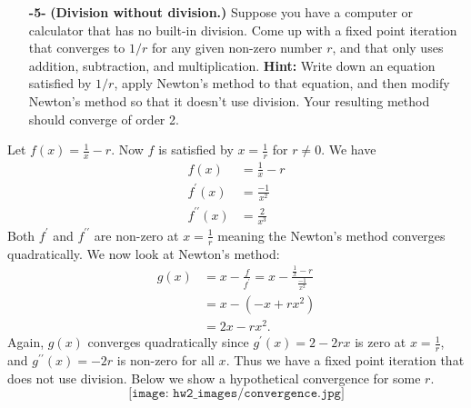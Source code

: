 \documentclass[11pt]{article}
\theoremstyle{definition}
\newcommand{\1}[1]{\mathbf{1} \left \{ #1 \right \}}
\begin{document}
\begin{itemize}
    \item[{\textbf{-5-}}] \textbf{(Division without division.)}  Suppose you have a computer or calculator that has no built-in division.  Come up with a fixed point iteration that converges to $1/r$ for any given non-zero number $r$, and that only uses addition, subtraction, and multiplication.  \textbf{Hint:}  Write down an equation satisfied by $1/r$, apply Newton's method to that equation, and then modify Newton's method so that it doesn't use division.  Your resulting method should converge of order 2.
\end{itemize}
Let \(f(x) = \frac{1}{x} - r\).  Now $f$ is satisfied by $x = \frac{1}{r}$ for $r \neq 0$.  We have
\begin{equation*}
    \begin{split}
        f(x) &= \frac{1}{x} - r \\
        f^{\prime}(x) &= \frac{-1}{x^2} \\
        f^{\prime\prime}(x) &= \frac{2}{x^3}
    \end{split}
\end{equation*}
Both $f^{\prime}$ and $f^{\prime\prime}$ are non-zero at $x = \frac{1}{r}$ meaning the Newton's method converges quadratically.  We now look at Newton's method:
\begin{equation*}
    \begin{split}
        g(x) &= x - \frac{f}{f^{\prime}} = x - \frac{\frac{1}{x} - r}{\frac{-1}{x^2}} \\
        &= x - (-x + rx^2) \\
        &= 2x - rx^2.
    \end{split}
\end{equation*}
Again, $g(x)$ converges quadratically since $g^{\prime}(x) = 2 - 2rx$ is zero at $x = \frac{1}{r}$, and $g^{\prime\prime}(x) = -2r$ is non-zero for all $x$.  Thus we have a fixed point iteration that does not use division.  Below we show a hypothetical convergence for some $r$.
\[\texttt{[image: hw2\_images/convergence.jpg]}\]
\end{document}
